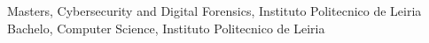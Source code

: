 %
%
%


\begin{scholarship}
					{Masters, Cybersecurity and Digital Forensics, Instituto Politecnico de Leiria}
					{Bachelo, Computer Science, Instituto Politecnico de Leiria}
\end{scholarship}